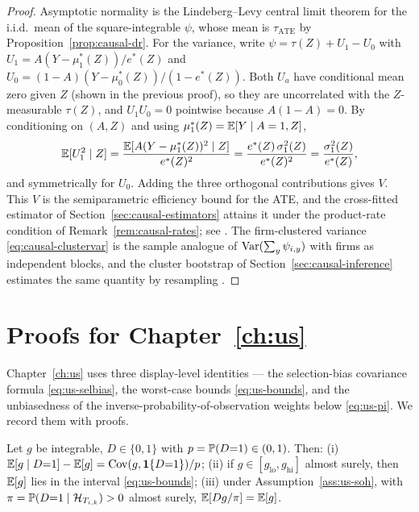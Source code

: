 \begin{proof}
Asymptotic normality is the Lindeberg--Levy central limit theorem for the i.i.d.\ mean of the
square-integrable $\psi$, whose mean is $\tau_{\mathrm{ATE}}$ by Proposition~\ref{prop:causal-dr}.
For the variance, write $\psi = \tau(Z) + U_1 - U_0$ with $U_1 = A(Y - \mu_1^*(Z))/e^*(Z)$ and $U_0
= (1-A)(Y - \mu_0^*(Z))/(1 - e^*(Z))$. Both $U_a$ have conditional mean zero given $Z$ (shown in the
previous proof), so they are uncorrelated with the $Z$-measurable $\tau(Z)$, and $U_1 U_0 = 0$
pointwise because $A(1-A) = 0$. By conditioning on $(A, Z)$ and using $\mu_1^*(Z) = \mathbb{E}[Y \mid A=1,
Z]$,
\[
\mathbb{E}[U_1^2 \mid Z] = \frac{\mathbb{E}[A (Y - \mu_1^*(Z))^2 \mid Z]}{e^*(Z)^2}
= \frac{e^*(Z)\, \sigma_1^2(Z)}{e^*(Z)^2} = \frac{\sigma_1^2(Z)}{e^*(Z)},
\]
and symmetrically for $U_0$. Adding the three orthogonal contributions gives $V$. This $V$ is the
semiparametric efficiency bound for the ATE, and the cross-fitted estimator of
Section~\ref{sec:causal-estimators} attains it under the product-rate condition of
Remark~\ref{rem:causal-rates}; see \cite{chernozhukov2018}. The firm-clustered variance
\eqref{eq:causal-clustervar} is the sample analogue of $\mathrm{Var}(\sum_y \psi_{i,y})$ with firms as
independent blocks, and the cluster bootstrap of Section~\ref{sec:causal-inference} estimates the
same quantity by resampling \cite{efron1994}.
\end{proof}

\section{Proofs for Chapter~\ref{ch:us}}
\label{app:proofs-ch6}

Chapter~\ref{ch:us} uses three display-level identities --- the selection-bias covariance formula
\eqref{eq:us-selbias}, the worst-case bounds \eqref{eq:us-bounds}, and the unbiasedness of the
inverse-probability-of-observation weights below \eqref{eq:us-pi}. We record them with proofs.

\begin{proposition}
\label{prop:app-selection}
Let $g$ be integrable, $D \in \{0,1\}$ with $p = \mathbb{P}(D{=}1) \in (0,1)$. Then: (i) $\mathbb{E}[g \mid
D{=}1] - \mathbb{E}[g] = \mathrm{Cov}(g, \mathbf{1}\{D{=}1\})/p$; (ii) if $g \in [g_{\mathrm{lo}}, g_{\mathrm{hi}}]$ almost
surely, then $\mathbb{E}[g]$ lies in the interval \eqref{eq:us-bounds}; (iii) under
Assumption~\ref{ass:us-soh}, with $\pi = \mathbb{P}(D{=}1 \mid \mathcal{H}_{T_{i,k}}) > 0$ almost surely, $\mathbb{E}[D
g/\pi] = \mathbb{E}[g]$.
\end{proposition}

